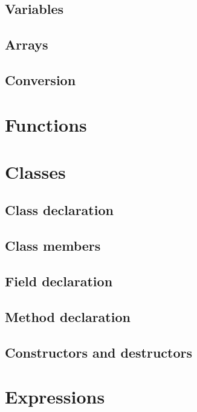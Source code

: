 \section{Variables}
\section{Arrays}
\section{Conversion}

\chapter{Functions}

\chapter{Classes}
\section{Class declaration}
\section{Class members}
\section{Field declaration}
\section{Method declaration}
\section{Constructors and destructors}

\chapter{Expressions}
